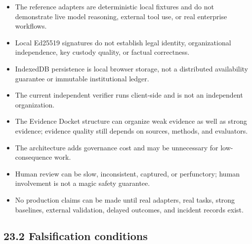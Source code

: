 \begin{itemize}
\item
  The reference adapters are deterministic local fixtures and do not
  demonstrate live model reasoning, external tool use, or real
  enterprise workflows.
\item
  Local Ed25519 signatures do not establish legal identity,
  organizational independence, key custody quality, or factual
  correctness.
\item
  IndexedDB persistence is local browser storage, not a distributed
  availability guarantee or immutable institutional ledger.
\item
  The current independent verifier runs client-side and is not an
  independent organization.
\item
  The Evidence Docket structure can organize weak evidence as well as
  strong evidence; evidence quality still depends on sources, methods,
  and evaluators.
\item
  The architecture adds governance cost and may be unnecessary for
  low-consequence work.
\item
  Human review can be slow, inconsistent, captured, or perfunctory;
  human involvement is not a magic safety guarantee.
\item
  No production claims can be made until real adapters, real tasks,
  strong baselines, external validation, delayed outcomes, and incident
  records exist.
\end{itemize}

\subsection{23.2 Falsification
conditions}\label{falsification-conditions}

